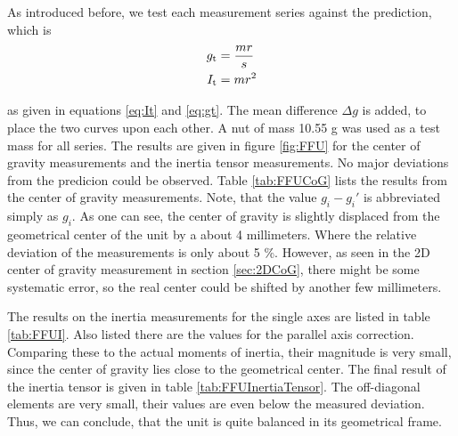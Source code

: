 \documentclass[journal]{IEEEtran}
\begin{document}
As introduced before, we test each measurement series against the prediction, which is
\begin{align*}
	g_{\textup{t}} & =	\frac{mr}{s} \\
	I_{\textup{t}} & = mr^2
\end{align*}

as given in equations \eqref{eq:It} and \eqref{eq:gt}. The mean difference $\Delta g$ is added, to place the two curves upon each other.
A nut of mass 10.55 g was used as a test mass for all series.
The results are given in figure \ref{fig:FFU} for the center of gravity measurements and the inertia tensor measurements.
No major deviations from the predicion could be observed.
Table \ref{tab:FFUCoG} lists the results from the center of gravity measurements.
Note, that the value $g_i - g_i'$ is abbreviated simply as $g_i$.
As one can see, the center of gravity is slightly displaced from the geometrical center of the unit by a about 4 millimeters. Where the relative deviation of the measurements is only about 5 \%.
However, as seen in the 2D center of gravity measurement in section \ref{sec:2DCoG}, there might be some systematic error, so the real center could be shifted by another few millimeters.

The results on the inertia measurements for the single axes are listed in table \ref{tab:FFUI}. Also listed there are the values for the parallel axis correction. Comparing these to the actual moments of inertia, their magnitude is very small, since the center of gravity lies close to the geometrical center.
The final result of the inertia tensor is given in table \ref{tab:FFUInertiaTensor}. The off-diagonal elements are very small, their values are even below the measured deviation.
Thus, we can conclude, that the unit is quite balanced in its geometrical frame.
\end{document}

